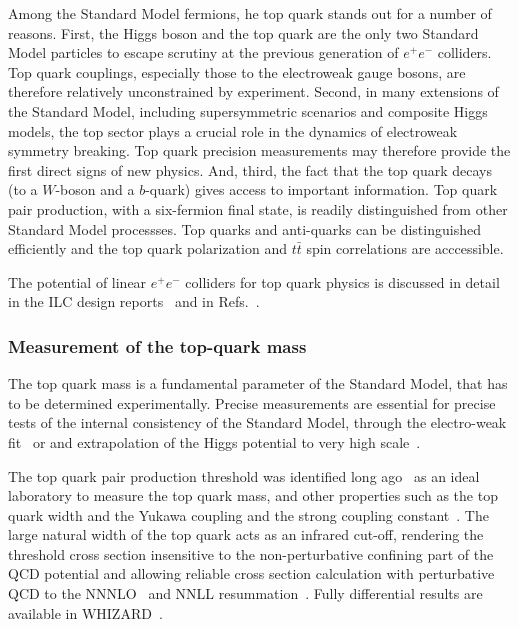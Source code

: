 Among the Standard Model fermions, he top quark stands out for a number of reasons. First, the Higgs boson
and the top quark are the only two Standard Model particles to escape scrutiny at the previous generation
of $e^+e^-$ colliders. Top quark couplings, especially those to the electroweak gauge bosons, are therefore
relatively unconstrained by experiment. Second, in many extensions of the Standard Model, including
supersymmetric scenarios and composite Higgs models, the top sector plays a crucial role in the dynamics
of electroweak symmetry breaking. Top quark precision measurements may therefore provide the first direct signs of new physics.
And, third, the fact that the top quark decays (to a $W$-boson and a $b$-quark) gives access to important information. Top quark
pair production, with a six-fermion final state, is readily distinguished from other Standard Model processses. Top quarks
and anti-quarks can be distinguished efficiently and the top quark polarization and $t\bar{t}$ spin correlations are acccessible. 

The potential of linear $e^+e^-$ colliders for top quark physics is discussed in detail in the ILC design reports~\cite{}
and in Refs.~\cite{Agashe:2013hma,Vos:2016til,Abramowicz:2018rjq}.

\subsubsection{Measurement of the top-quark mass}
\label{subsubsec:highE:topmass}

The top quark mass is a fundamental parameter of the Standard Model, that has to be
determined experimentally. Precise measurements are essential for precise tests of
the internal consistency of the Standard Model, through the electro-weak
fit~\cite{Baak:2014ora} or and extrapolation of the Higgs potential to very high
scale~\cite{Degrassi:2012ry}.

The top quark pair production threshold was identified long ago~\cite{Gusken:1985nf} as
an ideal laboratory to measure the top quark mass, and other properties such as the top quark
width and the Yukawa coupling and the strong coupling constant~\cite{Strassler:1990nw}.
The large natural width of the top quark acts as an infrared cut-off,
rendering the threshold cross section insensitive to the non-perturbative confining part
of the QCD potential and allowing reliable cross section calculation with perturbative QCD
to the NNNLO~\cite{Beneke:2015kwa} and NNLL resummation~\cite{Hoang:2013uda}. Fully
differential results are available in WHIZARD~\cite{Bach:2017ggt}.

